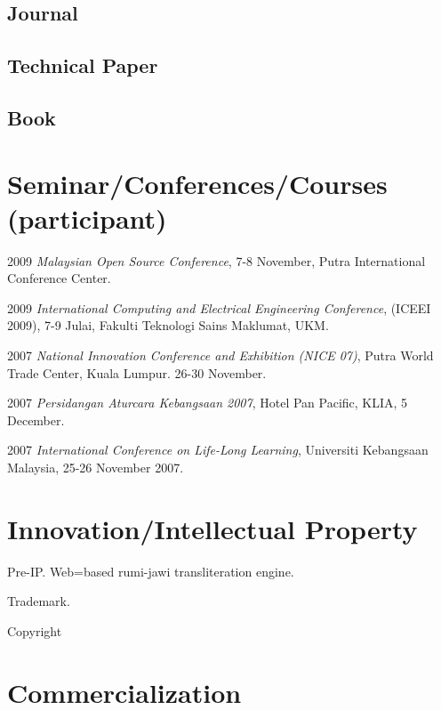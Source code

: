 \documentclass[a4paper]{article}
\newcommand\textem\textit
\begin{document}
\subsection*{Journal}

\subsection*{Technical Paper}

\subsection*{Book}

\section{Seminar/Conferences/Courses (participant)}

\begin{CV}
\item[2009] \textit{Malaysian Open Source Conference}, 7-8 November, Putra International Conference Center.
\item[2009] \textit{International Computing and Electrical Engineering Conference}, (ICEEI 2009), 7-9 Julai, Fakulti Teknologi Sains Maklumat, UKM. 
\item[2007] \textem{National Innovation Conference and Exhibition (NICE 07)},  Putra World Trade Center, Kuala Lumpur. 26-30 November. 
\item[2007] \textem{Persidangan Aturcara Kebangsaan 2007}, Hotel Pan Pacific, KLIA, 5 December. 
\item[2007] \textem{International Conference on Life-Long Learning}, Universiti Kebangsaan Malaysia, 25-26 November 2007. 
\end{CV}



\section{Innovation/Intellectual Property}
\begin{CV}
\item Pre-IP. Web=based rumi-jawi transliteration engine.
\item Trademark.
\item Copyright
\end{CV}
\section{Commercialization}
\end{document}
